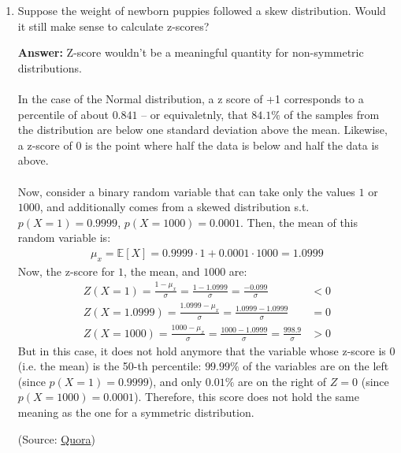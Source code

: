 \documentclass{article}
\newenvironment{QandA}{\begin{enumerate}[label=\arabic*.]}{\end{enumerate}}
\newenvironment{InnerQandA}{\begin{enumerate}[label=\roman*.]}{\end{enumerate}}
\newenvironment{answer}{\par\normalfont \textbf{Answer:}}{}
\newcommand{\Exp}[1]{\mathbb{E}\left[ #1 \right]}
\begin{document}
\begin{QandA}
\begin{InnerQandA}
        \item Suppose the weight of newborn puppies followed a skew distribution. Would it still make sense to calculate z-scores?
        \begin{answer}
            Z-score wouldn't be a  meaningful quantity for non-symmetric distributions. \\\\
            In the case of the Normal distribution, a z score of +1 corresponds to a percentile of about $0.841$ -- or equivaletnly, that $84.1\%$ of the samples from the distribution are below one standard deviation above the mean. Likewise, a z-score of $0$ is the point where half the data is below and half the data is above. \\\\
            Now, consider a binary random variable that can take only the values $1$ or $1000$, and additionally comes from a skewed distribution s.t. $p(X=1) = 0.9999$, $p(X=1000) = 0.0001$. Then, the mean of this random variable is:
            \begin{align*}
                \mu_x = \Exp{X} = 0.9999 \cdot 1 + 0.0001 \cdot 1000 = 1.0999
            \end{align*}
            Now, the z-score for $1$, the mean, and $1000$ are:
            \begin{align*}
                Z(X=1) = \frac{1 - \mu_x}{\sigma} = \frac{1 - 1.0999}{\sigma} = \frac{-0.099}{\sigma} &< 0 \\
                Z(X=1.0999) = \frac{1.0999 - \mu_x}{\sigma} = \frac{1.0999 - 1.0999}{\sigma} &= 0 \\
                Z(X=1000) = \frac{1000 - \mu_x}{\sigma} = \frac{1000 - 1.0999}{\sigma} = \frac{998.9}{\sigma} &> 0
            \end{align*}
            But in this case, it does not hold anymore that the variable whose z-score is 0 (i.e. the mean) is the 50-th percentile: $99.99\%$ of the variables are on the left (since $p(X=1) = 0.9999$), and only $0.01\%$ are on the right of $Z=0$ (since $p(X=1000) = 0.0001$). Therefore, this score does not hold the same meaning as the one for a symmetric distribution.
            
            (Source: \href{https://qr.ae/pvg5Ih}{Quora})
        \end{answer}
    \end{InnerQandA}


\end{QandA}
\end{document}

